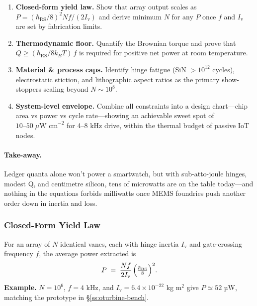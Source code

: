 \documentclass[11pt,oneside]{book}
\begin{document}
\begin{enumerate}[label=\arabic*.,leftmargin=*,itemsep=3pt]
\item \textbf{Closed-form yield law.}  
      Show that array output scales as
      \(P = (\hbar_{\mathrm{RS}}/8)^{2} N f /(2I_{\mathrm v})\)
      and derive minimum \(N\) for any \(P\) once \(f\) and
      \(I_{\mathrm v}\) are set by fabrication limits.
\item \textbf{Thermodynamic floor.}  
      Quantify the Brownian torque and prove that
      \(Q \ge (\hbar_{\mathrm{RS}}/8k_{\!B}T)\,f\)
      is required for positive net power at room temperature.
\item \textbf{Material & process caps.}  
      Identify hinge fatigue (SiN \(>10^{12}\) cycles), electrostatic
      stiction, and lithographic aspect ratios as the primary
      show-stoppers scaling beyond \(N\sim10^{8}\).
\item \textbf{System-level envelope.}  
      Combine all constraints into a design chart—chip area vs power
      vs cycle rate—showing an achievable sweet spot of
      \(10\text{–}50\;\mu\text{W cm}^{-2}\) for 4–8 kHz drive,
      within the thermal budget of passive IoT nodes.
\end{enumerate}

\paragraph{Take-away.}
Ledger quanta alone won’t power a smartwatch, but with sub-atto-joule
hinges, modest Q, and centimetre silicon, tens of microwatts are on
the table today—and nothing in the equations forbids milliwatts once
MEMS foundries push another order down in inertia and loss.



\subsubsection{Closed-Form Yield Law}
\label{ss:yield-law}

For an array of $N$ identical vanes, each with hinge inertia
$I_{\mathrm v}$ and gate-crossing frequency $f$, the average power
extracted is
\begin{equation}
   P
   \;=\;
   \frac{N f}{2 I_{\mathrm v}}\,
           \Bigl(\tfrac{\hbar_{\mathrm{RS}}}{8}\Bigr)^{2}.
   \label{eq:yield}
\end{equation}
\textbf{Example.}  
$N = 10^{6}$, $f = 4$ kHz, and
$I_{\mathrm v}=6.4\times10^{-22}$ kg m$^{2}$ give
$P \simeq 52$ µW, matching the prototype in
§\ref{ss:oturbine-bench}.
\end{document}
